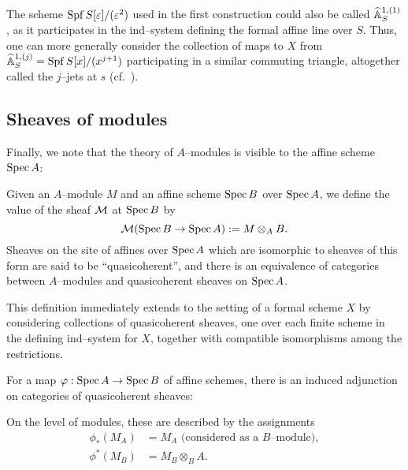 \begin{remark}\label{jJetsRemark}
The scheme $\operatorname{Spf} S[\varepsilon] / (\varepsilon^2)$ used in the first construction could also be called $\widehat{\mathbb{A}}^{1,(1)}_S$, as it participates in the ind--system defining the formal affine line over $S$.  Thus, one can more generally consider the collection of maps to $X$ from $\widehat{\mathbb{A}}^{1,(j)}_S = \operatorname{Spf} S[x] / (x^{j+1})$ participating in a similar commuting triangle, altogether called the $j$--jets at $s$ (cf.\ ).
\end{remark}

\subsection{Sheaves of modules}

Finally, we note that the theory of $A$--modules is visible to the affine scheme $\operatorname{Spec} A$:
\begin{definition}\label{QCohDefinition}
Given an $A$--module $M$ and an affine scheme $\operatorname{Spec} B$ over $\operatorname{Spec} A$, we define the value of the sheaf $\mathcal{M}$ at $\operatorname{Spec} B$ by \[\mathcal{M}(\operatorname{Spec} B \to \operatorname{Spec} A) := M \otimes_A B.\]  Sheaves on the site of affines over $\operatorname{Spec} A$ which are isomorphic to sheaves of this form are said to be ``quasicoherent'', and there is an equivalence of categories between $A$--modules and quasicoherent sheaves on $\operatorname{Spec} A$.
\end{definition}

\begin{remark}
This definition immediately extends to the setting of a formal scheme $X$ by considering collections of quasicoherent sheaves, one over each finite scheme in the defining ind--system for $X$, together with compatible isomorphisms among the restrictions.
\end{remark}

\begin{definition}
For a map $\varphi: \operatorname{Spec} A \to \operatorname{Spec} B$ of affine schemes, there is an induced adjunction on categories of quasicoherent sheaves:
\begin{center}
\end{center}
On the level of modules, these are described by the assignments
\begin{align*}
\phi_*(M_A) & = \text{$M_A$ (considered as a $B$--module)}, \\
\phi^*(M_B) & = M_B \otimes_B A.
\end{align*}
\end{definition}

